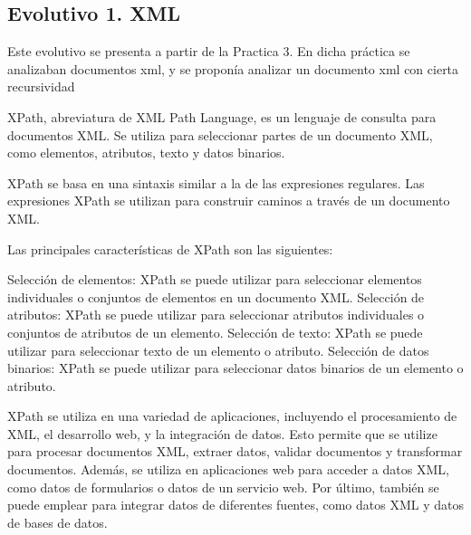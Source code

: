 
\subsection{Evolutivo 1. XML}

Este evolutivo se presenta a partir de la Practica 3. En dicha práctica se analizaban documentos xml, y se proponía analizar un documento xml con cierta recursividad

XPath, abreviatura de XML Path Language, es un lenguaje de consulta para documentos XML. Se utiliza para seleccionar partes de un documento XML, como elementos, atributos, texto y datos binarios.

XPath se basa en una sintaxis similar a la de las expresiones regulares. Las expresiones XPath se utilizan para construir caminos a través de un documento XML.

Las principales características de XPath son las siguientes:

    Selección de elementos: XPath se puede utilizar para seleccionar elementos individuales o conjuntos de elementos en un documento XML.
    Selección de atributos: XPath se puede utilizar para seleccionar atributos individuales o conjuntos de atributos de un elemento.
    Selección de texto: XPath se puede utilizar para seleccionar texto de un elemento o atributo.
    Selección de datos binarios: XPath se puede utilizar para seleccionar datos binarios de un elemento o atributo.


XPath se utiliza en una variedad de aplicaciones, incluyendo el procesamiento de XML, el desarrollo web, y la integración de datos. Esto permite que se utilize para procesar documentos XML, extraer datos, validar documentos y transformar documentos. Además, se utiliza en aplicaciones web para acceder a datos XML, como datos de formularios o datos de un servicio web. Por último, también se puede emplear para integrar datos de diferentes fuentes, como datos XML y datos de bases de datos.


